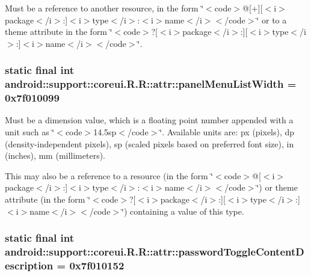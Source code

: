 Must be a reference to another resource, in the form \char`\"{}$<$code$>$@\mbox{[}+\mbox{]}\mbox{[}$<$i$>$package$<$/i$>$:\mbox{]}$<$i$>$type$<$/i$>$:$<$i$>$name$<$/i$>$$<$/code$>$\char`\"{} or to a theme attribute in the form \char`\"{}$<$code$>$?\mbox{[}$<$i$>$package$<$/i$>$:\mbox{]}\mbox{[}$<$i$>$type$<$/i$>$:\mbox{]}$<$i$>$name$<$/i$>$$<$/code$>$\char`\"{}. \hypertarget{classandroid_1_1support_1_1coreui_1_1_r_1_1attr_54b7570814585d460400c1cd565a5462}{
\subsubsection[{panelMenuListWidth}]{\setlength{\rightskip}{0pt plus 5cm}static final int android::support::coreui.R.R::attr::panelMenuListWidth = 0x7f010099}}
\label{classandroid_1_1support_1_1coreui_1_1_r_1_1attr_54b7570814585d460400c1cd565a5462}


Must be a dimension value, which is a floating point number appended with a unit such as \char`\"{}$<$code$>$14.5sp$<$/code$>$\char`\"{}. Available units are: px (pixels), dp (density-independent pixels), sp (scaled pixels based on preferred font size), in (inches), mm (millimeters). 

This may also be a reference to a resource (in the form \char`\"{}$<$code$>$@\mbox{[}$<$i$>$package$<$/i$>$:\mbox{]}$<$i$>$type$<$/i$>$:$<$i$>$name$<$/i$>$$<$/code$>$\char`\"{}) or theme attribute (in the form \char`\"{}$<$code$>$?\mbox{[}$<$i$>$package$<$/i$>$:\mbox{]}\mbox{[}$<$i$>$type$<$/i$>$:\mbox{]}$<$i$>$name$<$/i$>$$<$/code$>$\char`\"{}) containing a value of this type. \hypertarget{classandroid_1_1support_1_1coreui_1_1_r_1_1attr_9c24ad5c8557689ad0c26ddf8a117923}{
\subsubsection[{passwordToggleContentDescription}]{\setlength{\rightskip}{0pt plus 5cm}static final int android::support::coreui.R.R::attr::passwordToggleContentDescription = 0x7f010152}}
\label{classandroid_1_1support_1_1coreui_1_1_r_1_1attr_9c24ad5c8557689ad0c26ddf8a117923}



